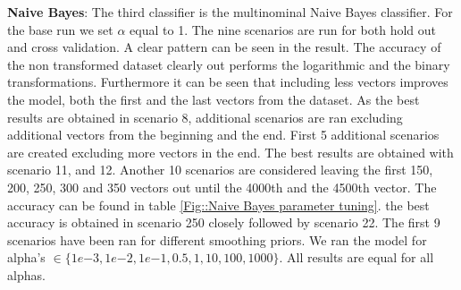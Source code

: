 \documentclass[11pt]{article}
\begin{document}
\newline 
\textbf{Naive Bayes}: The third classifier is the multinominal Naive Bayes classifier. For the base run we set $\alpha$ equal to 1. The nine scenarios are run for both hold out and cross validation. A clear pattern can be seen in the result. The accuracy of the non transformed dataset clearly out performs the logarithmic and the binary transformations. Furthermore it can be seen that including less vectors improves the model, both the first and the last vectors from the dataset. As the best results are obtained in scenario 8, additional scenarios are ran excluding additional vectors from the beginning and the end.  
\newline
First 5 additional scenarios are created excluding more vectors in the end. The best results are obtained with scenario 11, and 12. Another 10 scenarios are considered leaving the first 150, 200, 250, 300 and 350 vectors out until the 4000th and the 4500th vector. The accuracy can be found in table \ref{Fig::Naive Bayes parameter tuning}. the best accuracy is obtained in scenario 250 closely followed by scenario 22.
\newline
The first 9 scenarios have been ran for different smoothing priors. We ran the model for alpha's $\in \{1e{-3}, 1e{-2}, 1e{-1}, 0.5, 1, 10, 100, 1000\}$. All results are equal for all alphas.  
\end{document}
